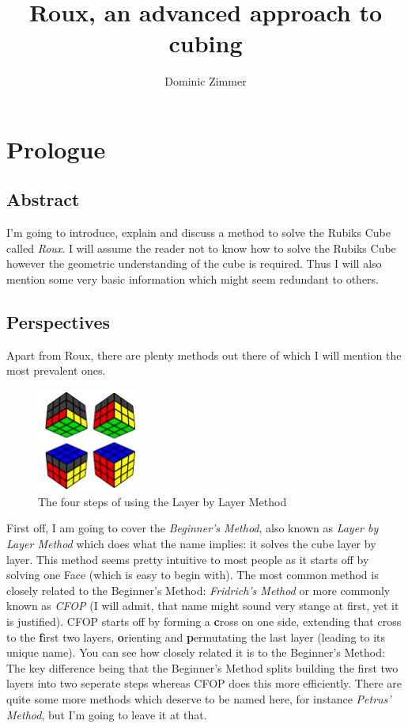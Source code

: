 \documentclass{scrreprt}
\begin{document}
\title{Roux, an advanced approach to cubing}
\author{Dominic Zimmer}
\maketitle 

\tableofcontents
\chapter{Prologue}

\section{Abstract}
I'm going to introduce, explain and discuss a method to solve the Rubiks Cube called \emph{Roux}. I will assume the reader not to know how to solve the Rubiks Cube however the geometric understanding of the cube is required. Thus I will also mention some very basic information which might seem redundant to others.

\section{Perspectives}
Apart from Roux, there are plenty methods out there of which I will mention the most prevalent ones.

\begin{figure}
\centering
\includegraphics[width=0.3\textwidth]{union.png}
\caption*{The four steps of using the Layer by Layer Method}
\end{figure}
First off, I am going to cover the \emph{Beginner's Method}, also known as \emph{Layer by Layer Method} which does what the name implies: it solves the cube layer by layer. This method seems pretty intuitive to most people as it starts off by solving one Face (which is easy to begin with). The most common method is closely related to the Beginner's Method: \emph{Fridrich's Method} or more commonly known as \emph{CFOP} (I will admit, that name might sound very stange at first, yet it is justified). CFOP starts off by forming a \textbf{c}ross on one side, extending that cross to the \textbf{f}irst two layers, \textbf{o}rienting and \textbf{p}ermutating the last layer (leading to its unique name). You can see how closely related it is to the Beginner's Method: The key difference being that the Beginner's Method splits building the first two layers into two seperate steps whereas CFOP does this more efficiently. There are quite some more methods which deserve to be named here, for instance \emph{Petrus' Method}, but I'm going to leave it at that.
\end{document}
